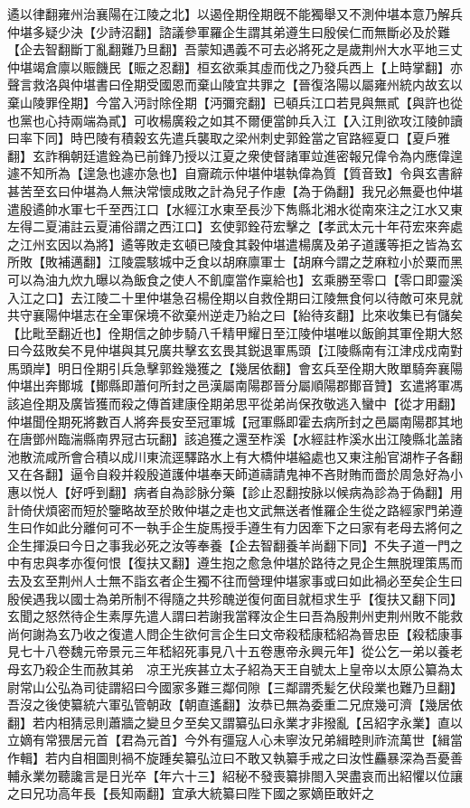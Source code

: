 遹以律翻雍州治襄陽在江陵之北】以遏佺期佺期旣不能獨舉又不測仲堪本意乃解兵仲堪多疑少決【少詩沼翻】諮議參軍羅企生謂其弟遵生曰殷侯仁而無斷必及於難【企去智翻斷丁亂翻難乃旦翻】吾蒙知遇義不可去必將死之是歲荆州大水平地三丈仲堪竭倉廪以賑饑民【賑之忍翻】桓玄欲乘其虛而伐之乃發兵西上【上時掌翻】亦聲言救洛與仲堪書曰佺期受國恩而棄山陵宜共罪之【晉復洛陽以屬雍州統内故玄以棄山陵罪佺期】今當入沔討除佺期【沔彌兖翻】已頓兵江口若見與無貳【與許也從也黨也心持兩端為貳】可收楊廣殺之如其不爾便當帥兵入江【入江則欲攻江陵帥讀曰率下同】時巴陵有積穀玄先遣兵襲取之梁州刺史郭銓當之官路經夏口【夏戶雅翻】玄詐稱朝廷遣銓為已前鋒乃授以江夏之衆使督諸軍竝進密報兄偉令為内應偉遑遽不知所為【遑急也遽亦急也】自齎疏示仲堪仲堪執偉為質【質音致】令與玄書辭甚苦至玄曰仲堪為人無決常懷成敗之計為兒子作慮【為于偽翻】我兄必無憂也仲堪遣殷遹帥水軍七千至西江口【水經江水東至長沙下雋縣北湘水從南來注之江水又東左得二夏浦註云夏浦俗謂之西江口】玄使郭銓苻宏擊之【孝武太元十年苻宏來奔處之江州玄因以為將】遹等敗走玄頓已陵食其穀仲堪遣楊廣及弟子道護等拒之皆為玄所敗【敗補邁翻】江陵震駭城中乏食以胡麻廪軍士【胡麻今謂之芝麻粒小於粟而黑可以為油九炊九曝以為飯食之使人不飢廩當作稟給也】玄乘勝至零口【零口即靈溪入江之口】去江陵二十里仲堪急召楊佺期以自救佺期曰江陵無食何以待敵可來見就共守襄陽仲堪志在全軍保境不欲棄州逆走乃紿之曰【紿待亥翻】比來收集已有儲矣【比毗至翻近也】佺期信之帥步騎八千精甲耀日至江陵仲堪唯以飯餉其軍佺期大怒曰今茲敗矣不見仲堪與其兄廣共擊玄玄畏其鋭退軍馬頭【江陵縣南有江津戍戍南對馬頭岸】明日佺期引兵急擊郭銓幾獲之【幾居依翻】會玄兵至佺期大敗單騎奔襄陽仲堪出奔鄼城【鄼縣即蕭何所封之邑漢屬南陽郡晉分屬順陽郡鄼音贊】玄遣將軍馮該追佺期及廣皆獲而殺之傳首建康佺期弟思平從弟尚保孜敬逃入蠻中【從才用翻】仲堪聞佺期死將數百人將奔長安至冠軍城【冠軍縣即霍去病所封之邑屬南陽郡其地在唐鄧州臨湍縣南界冠古玩翻】該追獲之還至柞溪【水經註柞溪水出江陵縣北盖諸池散流咸所會合積以成川東流逕驛路水上有大橋仲堪縊處也又東注船官湖柞子各翻又在各翻】逼令自殺并殺殷道護仲堪奉天師道禱請鬼神不吝財賄而嗇於周急好為小惠以悦人【好呼到翻】病者自為診脉分藥【診止忍翻按脉以候病為診為于偽翻】用計倚伏煩密而短於鑒略故至於敗仲堪之走也文武無送者惟羅企生從之路經家門弟遵生曰作如此分離何可不一執手企生旋馬授手遵生有力因牽下之曰家有老母去將何之企生揮淚曰今日之事我必死之汝等奉養【企去智翻養羊尚翻下同】不失子道一門之中有忠與孝亦復何恨【復扶又翻】遵生抱之愈急仲堪於路待之見企生無脱理策馬而去及玄至荆州人士無不詣玄者企生獨不往而營理仲堪家事或曰如此禍必至矣企生曰殷侯遇我以國士為弟所制不得隨之共殄醜逆復何面目就桓求生乎【復扶又翻下同】玄聞之怒然待企生素厚先遣人謂曰若謝我當釋汝企生曰吾為殷荆州吏荆州敗不能救尚何謝為玄乃收之復遣人問企生欲何言企生曰文帝殺嵇康嵇紹為晉忠臣【殺嵇康事見七十八卷魏元帝景元三年嵇紹死事見八十五卷惠帝永興元年】從公乞一弟以養老母玄乃殺企生而赦其弟　凉王光疾甚立太子紹為天王自號太上皇帝以太原公纂為太尉常山公弘為司徒謂紹曰今國家多難三鄰伺隙【三鄰謂秃髪乞伏段業也難乃旦翻】吾沒之後使纂統六軍弘管朝政【朝直遙翻】汝恭已無為委重二兄庶幾可濟【幾居依翻】若内相猜忌則蕭牆之變旦夕至矣又謂纂弘曰永業才非撥亂【呂紹字永業】直以立嫡有常猥居元首【君為元首】今外有彊寇人心未寧汝兄弟緝睦則祚流萬世【緝當作輯】若内自相圖則禍不旋踵矣纂弘泣曰不敢又執纂手戒之曰汝性麤暴深為吾憂善輔永業勿聽讒言是日光卒【年六十三】紹秘不發喪纂排閤入哭盡哀而出紹懼以位讓之曰兄功高年長【長知兩翻】宜承大統纂曰陛下國之冢嫡臣敢奸之